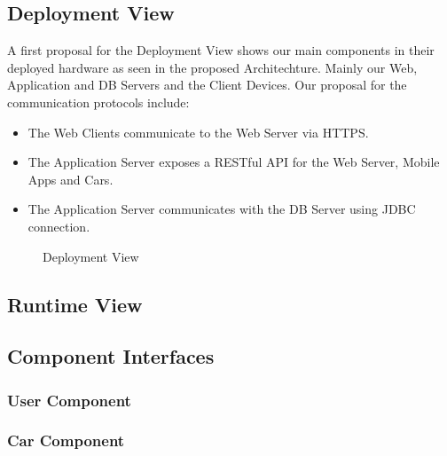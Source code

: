 \documentclass[a4paper]{article}
\begin{document}
\subsection{Deployment View}
A first proposal for the Deployment View shows our main components in their deployed hardware as seen in the proposed Architechture. Mainly our Web, Application and DB Servers and the Client Devices. Our proposal for the communication protocols include:
\begin{itemize} 
\item The Web Clients communicate to the Web Server via HTTPS. 
\item The Application Server exposes a RESTful API for the Web Server, Mobile Apps and Cars. 
\item The Application Server communicates with the DB Server using JDBC connection.
\end{itemize}
\begin{figure}[h]
\centering
\vspace*{\fill}
\noindent{}%
\caption {Deployment View}
\vspace*{0.5cm}
\end{figure}
\newpage

\subsection{Runtime View}

\newpage
\subsection{Component Interfaces}

\subsubsection{User Component}
\begin{figure}[h]
\centering
\vspace*{\fill}
\noindent{}%
\vspace*{0.1cm}
\end{figure}

\subsubsection{Car Component}
\begin{figure}[h]
\centering
\vspace*{\fill}
\noindent{}%
\vspace*{0.1cm}
\end{figure}
\end{document}
